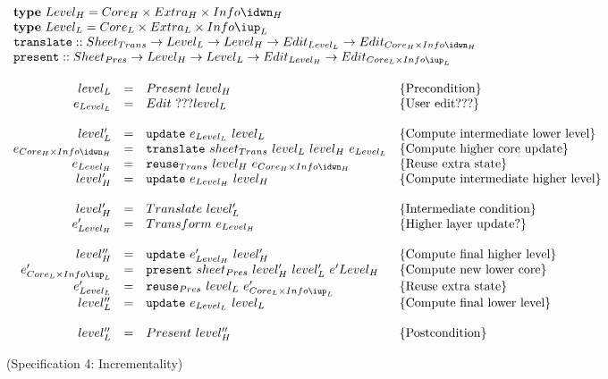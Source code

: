 \begin{small}\( \begin{array}{lcl}  \label{inv:incrementality}
\text{\bf type}~Level_{H}  =  Core_{H} \times Extra_{H} \times Info\idwn_{H}\\
\text{\bf type}~Level_{L}  =  Core_{L} \times Extra_{L} \times Info\iup_{L}\\
{\tt translate}  ::  Sheet_{Trans} \rightarrow Level_{L} \rightarrow Level_{H} \rightarrow  Edit_{Level_{L}} \rightarrow Edit_{Core_{H}\times Info\idwn_{H}} \\
{\tt present}  ::  Sheet_{Pres} \rightarrow Level_{H} \rightarrow Level_{L}  \rightarrow Edit_{Level_{H}} \rightarrow Edit_{Core_{L}\times Info\iup_{L}}\\
\\
\end{array}\) \\
\( \begin{array}{rcll}  
level_{L} 	& = & Present~level_{H}						& \text{\{Precondition\}}\\
e_{Level_{L}}& = & Edit~???level_{L}							& \text{\{User edit???\}}\\
\\
level'_{L} 	& = & {\tt update}~e_{Level_{L}}~level_{L}                 & \text{\{Compute intermediate lower level\}}\\
e_{Core_{H} \times Info\idwn_{H}}  & = & {\tt translate}~sheet_{Trans}~level_{L}~level_{H}~e_{Level_{L}} & \text{\{Compute higher core update\}}\\
e_{Level_{H}} & = & {\tt reuse}_{Trans}~level_{H}~e_{Core_{H}\times Info\idwn_{H}}     & \text{\{Reuse extra state\}}\\
level'_{H} & = & {\tt update}~e_{Level_{H}}~level_{H}                 & \text{\{Compute intermediate higher level\}}\\
\\
level'_{H} & = & Translate~level'_{L}						& \text{\{Intermediate condition\}}\\
e'_{Level_{H}} & = & Transform~e_{Level_{H}} 			& \text{\{Higher layer update?\}}\\
\\
level''_{H} & = & {\tt update}~e'_{Level_{H}}~level'_{H}                 & \text{\{Compute final higher level\}}\\
e'_{Core_{L}\times Info\iup_{L}}  & = & {\tt present}~sheet_{Pres}~level'_{H}~level'_{L}~e'{Level_{H}} & \text{\{Compute new lower core\}}\\
e'_{Level_{L}} & = & {\tt reuse}_{Pres}~level_{L}~e'_{Core_{L}\times Info\iup_{L}} & \text{\{Reuse extra state\}}\\
level''_{L} & = & {\tt update}~e_{Level_{L}}~level_{L}                 & \text{\{Compute final lower level\}}\\
\\
level''_{L} & = & Present~level''_{H}						& \text{\{Postcondition\}}\\
\end{array}\)
\end{small}
\begin{center}(Specification 4: Incrementality)\end{center}\vspace{1em}

